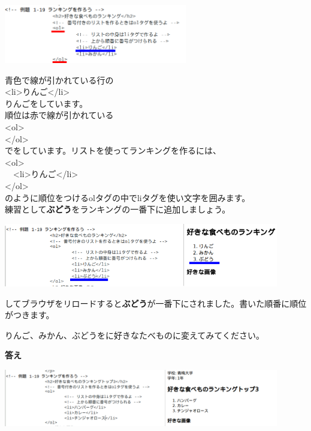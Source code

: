 \documentclass[a4paper,12pt]{jarticle}
\begin{document}
\includegraphics[width=0.6\textwidth]{textbook-img181.png}


青色で線が引かれている行の\\
{\textless}li{\textgreater}りんご{\textless}/li{\textgreater}\\
りんごをしています。\\
順位は赤で線が引かれている\\
{\textless}ol{\textgreater}\\
{\textless}/ol{\textgreater}\\
でをしています。リストを使ってランキングを作るには、\\
{\textless}ol{\textgreater}\\
\ \ {\textless}li{\textgreater}りんご{\textless}/li{\textgreater}\\
{\textless}/ol{\textgreater}\\
のように順位をつけるolタグの中でliタグを使い文字を囲みます。\\
練習として\textbf{ぶどう}をランキングの一番下に追加しましょう。\\


\bigskip


\includegraphics[width=0.9\textwidth]{textbook-img183.png}


\bigskip


してブラウザをリロードすると\textbf{ぶどう}が一番下にされました。書いた順番に順位がつきます。

りんご、みかん、ぶどうをに好きなたべものに変えてみてください。


\bigskip
\clearpage
\textbf{答え}


\bigskip



\includegraphics[width=0.9\textwidth]{textbook-img184.png}
\end{document}
